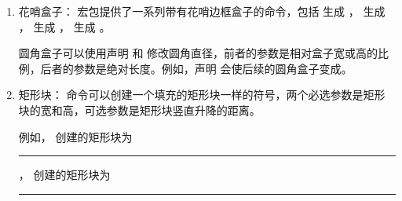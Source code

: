 \begin{enumerate}
\begin{tcolorbox}[sidebyside, sidebyside align=top, colback=white, lefthand width=0.6\linewidth]
\end{tcolorbox}

可选参数中的 {\ttfamily\itshape units} 确定旋转角的单位，默认为角度。设置 \verb|units=-360| 表示以度为单位且旋转正向为顺时针；设置 \verb|units=6.283185| 表示以弧度为单位且旋转正向为逆时针等。

\begin{tcolorbox}[sidebyside, righthand width=0.3\linewidth]
\begin{lstlisting}
$\pi$ \rotatebox{45}{$\pi$} \rotatebox{90}{$\pi$}
\makebox[0pt]{\rotatebox[origin=c]{30}{\dag}}\,%
\makebox[0pt]{\rotatebox[origin=c]{-30}{\dag}}
\end{lstlisting}

\tcblower

\Large
$\pi$  
\Huge
{}\,%
\end{tcolorbox}

\item 花哨盒子： 宏包提供了一系列带有花哨边框盒子的命令，包括 \boxforcmd{\\shadowbox{}} 生成  ，\boxforcmd{\\doublebox{}} 生成  ，\boxforcmd{\\ovalbox{}} 生成  ，\boxforcmd{\\Ovalbox{}} 生成  。

圆角盒子可以使用声明 \boxforcmd{\\cornersize{}} 和 \boxforcmd{\\cornersize*{}} 修改圆角直径，前者的参数是相对盒子宽或高的比例，后者的参数是绝对长度。例如，声明  会使后续的圆角盒子变成{}。

\item 矩形块：\boxforcmd{\\rule[]{}{}} 命令可以创建一个填充的矩形块一样的符号，两个必选参数是矩形块的宽和高，可选参数是矩形块竖直升降的距离。

例如，\boxforcmd{\\rule{10pt}{12pt}} 创建的矩形块为 \rule{10pt}{12pt} ，\boxforcmd{\\rule[-2pt]{3em}{0.5pt} } 创建的矩形块为 \rule[-2pt]{3em}{0.5pt} 

\end{enumerate}
